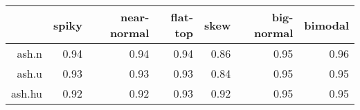 \begin{tabular}{rrrrrrr}
  \toprule  & spiky & near-normal & flat-top & skew & big-normal & bimodal \\ 
  \midrule ash.n & 0.94 & 0.94 & 0.94 & 0.86 & 0.95 & 0.96 \\ 
  ash.u & 0.93 & 0.93 & 0.93 & 0.84 & 0.95 & 0.95 \\ 
  ash.hu & 0.92 & 0.92 & 0.93 & 0.92 & 0.95 & 0.95 \\ 
   \bottomrule \end{tabular}


